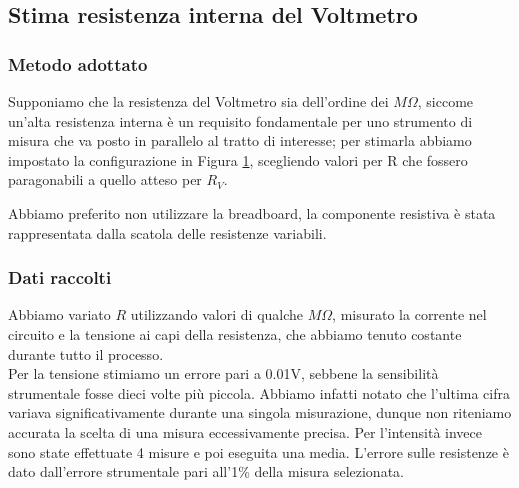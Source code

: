\documentclass[a4paper]{article}
\theoremstyle{definition}
\begin{document}
\subsection{Stima resistenza interna del Voltmetro}
\subsubsection*{Metodo adottato}
Supponiamo che la resistenza del Voltmetro sia dell'ordine dei \(M\Omega\), siccome un'alta resistenza interna è un requisito fondamentale per uno strumento di misura che va posto in parallelo al tratto di interesse; per stimarla abbiamo impostato la configurazione in Figura \ref{fig:voltmetro}, scegliendo valori per R che fossero paragonabili a quello atteso per \(R_{V}\).
\pagebreak

\begin{figure}[!ht]

	\caption{}
	  \label{fig:voltmetro}

\end{figure}

\noindent Abbiamo preferito non utilizzare la breadboard, la componente resistiva è stata rappresentata dalla scatola delle resistenze variabili.


\subsubsection*{Dati raccolti}
Abbiamo variato \(R\) utilizzando valori di qualche $M\Omega$, misurato la corrente nel circuito e la tensione ai capi della resistenza, che abbiamo tenuto costante durante tutto il processo.\\
 
\noindent  Per la tensione stimiamo un errore pari a 0.01V, sebbene la sensibilità strumentale fosse dieci volte più piccola. Abbiamo infatti notato che l'ultima cifra variava significativamente durante una singola misurazione, dunque non riteniamo accurata la scelta di una misura eccessivamente precisa. Per l'intensità invece sono state effettuate 4 misure e poi eseguita una media. L'errore sulle resistenze è dato dall'errore strumentale pari all'1\% della misura selezionata.\\
\end{document}

